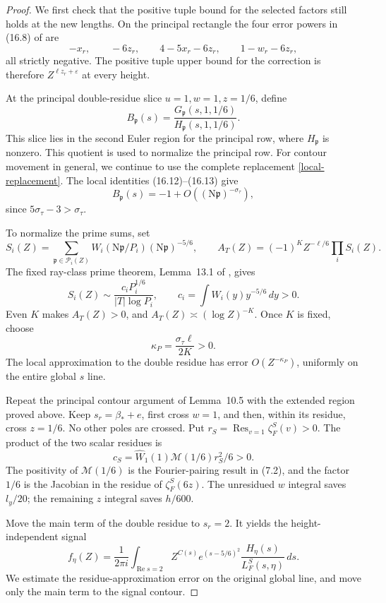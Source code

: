 \documentclass[10pt,reqno,a4paper]{amsart}
\theoremstyle{remark}
\newcommand{\N}{\mathrm N}
\newcommand{\Rea}{\operatorname{Re}}
\newcommand{\eps}{\varepsilon}
\newcommand{\pp}{\mathfrak p}
\newcommand{\st}{\sigma_\tau}
\newcommand{\bp}{\beta_*}
\begin{document}
\begin{proof}
We first check that the positive tuple bound for the selected factors
still holds at the new lengths. On the principal rectangle the four error
powers in (16.8) of \cite{q30} are
\[
            -x_r,\qquad -6z_r,\qquad
            4-5x_r-6z_r,\qquad 1-w_r-6z_r,
\]
all strictly negative. The positive tuple upper bound for the
correction is therefore $Z^{\ell z_r+\eps}$ at every height.

At the principal double-residue slice $u=1,w=1,z=1/6$, define
\[
                    B_\pp(s)=
                    \frac{G_\pp(s,1,1/6)}{H_\pp(s,1,1/6)}.
\]
This slice lies in the second Euler region for the principal row,
where $H_\pp$ is nonzero. This quotient is used to normalize the principal row. For contour
movement in general, we continue to use the complete replacement \eqref{local-replacement}. The local identities
(16.12)--(16.13) give
\[
                 B_\pp(s)=-1+O((\N\pp)^{-\st}),
\]
since $5\st-3>\st$.

To normalize the prime sums, set
\[
 S_i(Z)=\sum_{\pp\in\mathcal P_i(Z)}
             W_i(\N\pp/P_i)(\N\pp)^{-5/6},
 \qquad
 A_T(Z)=(-1)^KZ^{-\ell/6}\prod_i S_i(Z).
\]
The fixed ray-class prime theorem, Lemma~13.1 of \cite{q30}, gives
\[
 S_i(Z)\sim\frac{c_iP_i^{1/6}}{|T|\log P_i},
 \qquad c_i=\int W_i(y)y^{-5/6}\,dy>0.
\]
Even $K$ makes $A_T(Z)>0$, and
$A_T(Z)\asymp(\log Z)^{-K}$. Once $K$ is fixed, choose
\[
                         \kappa_P=\frac{\st\ell}{2K}>0.
\]
The local approximation to the double residue has error
$O(Z^{-\kappa_P})$, uniformly on the entire global $s$ line.

Repeat the principal contour argument of Lemma~10.5 with the
extended region proved above. Keep $s_r=\bp+e$, first cross
$w=1$, and then, within its residue, cross $z=1/6$. No other
poles are crossed. Put
$r_S=\operatorname*{Res}_{v=1}\zeta_F^S(v)>0$. The product of the
two scalar residues is
\[
                  c_S=\widehat W_1(1)\mathcal M(1/6)r_S^2/6>0.
\]
The positivity of $\mathcal M(1/6)$ is the Fourier-pairing result
in (7.2), and the factor $1/6$ is the Jacobian in the residue of
$\zeta_F^S(6z)$. The unresidued $w$ integral saves $l_y/20$;
the remaining $z$ integral saves $h/600$.

Move the main term of the double residue to $s_r=2$. It yields
the height-independent signal
\begin{equation}\label{signal}
 f_\eta(Z)=\frac1{2\pi i}\int_{\Rea s=2}
       Z^{C(s)}e^{(s-5/6)^2}
                 \frac{H_\eta(s)}{L_F^S(s,\eta)}\,ds.
\end{equation}
We estimate the residue-approximation error on the original global
line, and move only the main term to the signal contour.
\end{proof}
\end{document}
